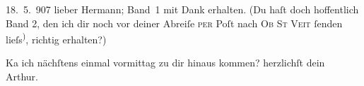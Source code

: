 \pstart
           \raggedleft{}{\pb}18. 5. 907\pend
           \vspace{0.5em}
\pstart
           lieber Hermann;{ }Band 1 mit Dank erhalten. (Du
               haſt doch hoffentlich Band 2,
               den ich dir noch vor deiner Abreiſe \textsc{per} Poſt nach \textsc{Ob St Veit}{ }ſenden lieſs\substVorne{}\textsuperscript{)}\substDazwischen{},\substHinten{} richtig erhalten?)\pend
           
\pstart
           Ka{\geminationn} ich nächſtens einmal vormittag zu dir hinaus
               kommen?\pend
           \pstart herzlichſt dein \spacefill\mbox{Arthur.}\pend{}\endnumbering{}  \newcommand{\dateiname}{L01673}\newcommand{\titel}{Arthur Schnitzler an Hermann Bahr, 18. 5. 1907}\newcommand{\editorInnen}{Herausgegeben von Martin Anton Müller}
